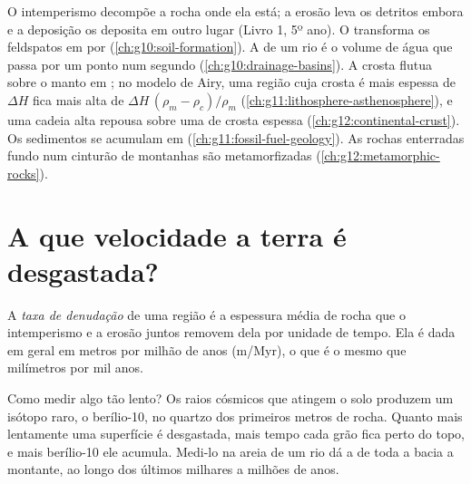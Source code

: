 \begin{recall}
O intemperismo decompõe a rocha onde ela está; a erosão leva os detritos
embora e a deposição os deposita em outro lugar (Livro 1, 5º ano). O
 transforma os feldspatos em  por
 (\cref{ch:g10:soil-formation}). A  de um rio é o volume de
água que passa por um ponto num segundo (\cref{ch:g10:drainage-basins}). A
crosta flutua sobre o manto em ; no modelo de Airy, uma região cuja
crosta é mais espessa de $\Delta H$ fica mais alta de $\Delta H\,(\rho_m - \rho_c)/\rho_m$
(\cref{ch:g11:lithosphere-asthenosphere}), e uma cadeia alta repousa sobre
uma  de crosta espessa (\cref{ch:g12:continental-crust}). Os sedimentos
se acumulam em  (\cref{ch:g11:fossil-fuel-geology}). As
rochas enterradas fundo num cinturão de montanhas são metamorfizadas
(\cref{ch:g12:metamorphic-rocks}).
\end{recall}

\section{A que velocidade a terra é desgastada?}

\begin{definition}\label{def:g12:destruction-of-mountains:denudation}
A \emph{taxa de denudação} de uma região é a
espessura média de rocha que o intemperismo e a erosão juntos removem dela
por unidade de tempo. Ela é dada em geral em metros por milhão de anos
(\unit{m/Myr}), o que é o mesmo que milímetros por mil anos.
\end{definition}

Como medir algo tão lento? Os raios cósmicos que atingem o solo produzem um
isótopo raro, o berílio-10, no quartzo dos primeiros metros de rocha. Quanto
mais lentamente uma superfície é desgastada, mais tempo cada grão fica perto
do topo, e mais berílio-10 ele acumula. Medi-lo na areia de um rio dá a  de toda a bacia a montante, ao longo dos últimos milhares
a milhões de anos.

